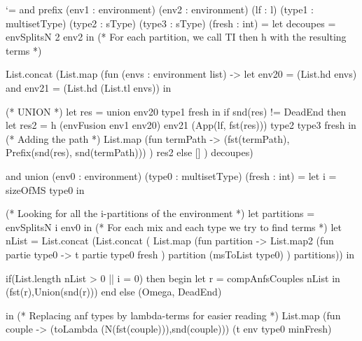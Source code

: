 \documentclass{article}
\let\origlstlisting=\lstlisting
\let\endoriglstlisting=\endlstlisting
\renewenvironment{lstlisting}
{\mathcode`\-=\hyphenmathcode
    \everymath{}\mathsurround=0pt\origlstlisting}
{\endoriglstlisting}
\begin{document}
\begin{lstlisting}
  and prefix (env1 : environment)  (env2 : environment) (lf : l) (type1 : multisetType)
               (type2 : sType) (type3 : sType) (fresh : int) = 
    let decoupes = envSplitsN 2 env2 in
    (* For each partition, we call TI then h with the resulting terms *)
    
    List.concat (List.map (fun (envs : environment list) -> 
	let env20 = (List.hd envs) and env21 = (List.hd (List.tl envs)) in
	
	(* UNION *)
	let res = union env20 type1 fresh in 
	if snd(res) != DeadEnd then
	  let res2 = h (envFusion env1 env20) env21 (App(lf, fst(res))) type2 type3 fresh in
	  (* Adding the path *)
	  List.map (fun termPath -> (fst(termPath), Prefix(snd(res), snd(termPath))) ) res2
	else []
    )
    decoupes)

  and union (env0 : environment) (type0 : multisetType) (fresh : int) = 
    let i = sizeOfMS type0 in
    
	(* Looking for all the i-partitions of the environment *)
    let partitions = envSplitsN i env0 in
	(* For each mix and each type we try to find terms *)
    let nList = List.concat (List.concat (
    List.map (fun partition -> 
      List.map2 (fun partie type0 -> 
          t partie type0 fresh
      ) partition (msToList type0)
    ) partitions)) in
    
    if(List.length nList > 0 || i = 0) then 
      begin
	let r = compAnfsCouples nList in
	(fst(r),Union(snd(r)))
      end
    else (Omega, DeadEnd)
      
  in (* Replacing anf types by lambda-terms for easier reading *)
  List.map (fun couple -> (toLambda (N(fst(couple))),snd(couple))) (t env type0 minFresh)
\end{lstlisting}

\newpage
\end{document}
